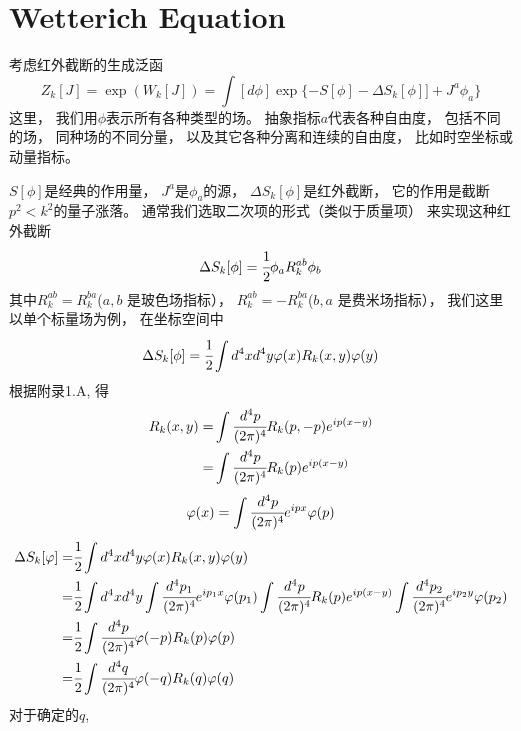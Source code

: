 \documentclass[UTF8]{ctexart}
\begin{document}
\section{Wetterich Equation}

考虑红外截断的生成泛函
\begin{equation}\label{eq0001}
Z_k[J]=\exp(W_k[J])=\int [d\phi]\exp\{-S[\phi]-\Delta S_k[\phi]]+J^a\phi_a\}
\end{equation}
这里，
我们用$\phi$表示所有各种类型的场。
抽象指标$a$代表各种自由度，
包括不同的场，
同种场的不同分量，
以及其它各种分离和连续的自由度，
比如时空坐标或动量指标。

$S[\phi]$是经典的作用量，
$J^a$是$\phi_a$的源，
$\Delta S_k[\phi]$是红外截断，
它的作用是截断$p^2<k^2$的量子涨落。
通常我们选取二次项的形式（类似于质量项）
来实现这种红外截断
\begin{equation}
\Delta S_k[\phi]=\cfrac{1}{2}\phi_aR_k^{ab}\phi_b
\end{equation}
其中$R_k^{ab}=R_k^{ba}$($a,b$ 是玻色场指标），
$R_k^{ab}=-R_k^{ba}$($b,a$ 是费米场指标），
我们这里以单个标量场为例，
在坐标空间中
\begin{equation}
\Delta S_k[\phi]=
\cfrac{1}{2}\int d^4xd^4y\varphi(x)R_k(x,y)\varphi(y)
\end{equation}
根据附录1.A,
得
\begin{equation}
\begin{split}
R_k(x,y)= & \int\cfrac{d^4p}{(2\pi)^4}R_k(p,-p)e^{ip(x-y)}\\
= & \int\cfrac{d^4p}{(2\pi)^4} R_k(p)e^{ip(x-y)}
\end{split}
\end{equation}
\begin{equation}
\varphi(x)=\int\cfrac{d^4p}{(2\pi)^4}e^{ipx}\varphi(p)
\end{equation}
\begin{equation}
\begin{split}
\Delta S_k[\varphi]=&\cfrac{1}{2}\int d^4xd^4y\varphi(x)R_k(x,y)\varphi(y)\\
=&\cfrac{1}{2}\int d^4xd^4y
\int\cfrac{d^4p_1}{(2\pi)^4}e^{ip_1x}\varphi(p_1)
\int\cfrac{d^4p}{(2\pi)^4}R_k(p)e^{ip(x-y)}
\int\cfrac{d^4p_2}{(2\pi)^4}e^{ip_2y}\varphi(p_2)\\
=&\cfrac{1}{2}\int\cfrac{d^4p}{(2\pi)^4}\varphi(-p)R_k(p)\varphi(p)\\
=&\cfrac{1}{2}\int\cfrac{d^4q}{(2\pi)^4}\varphi(-q)R_k(q)\varphi(q)
\end{split}
\end{equation}
对于确定的$q$,
\end{document}
